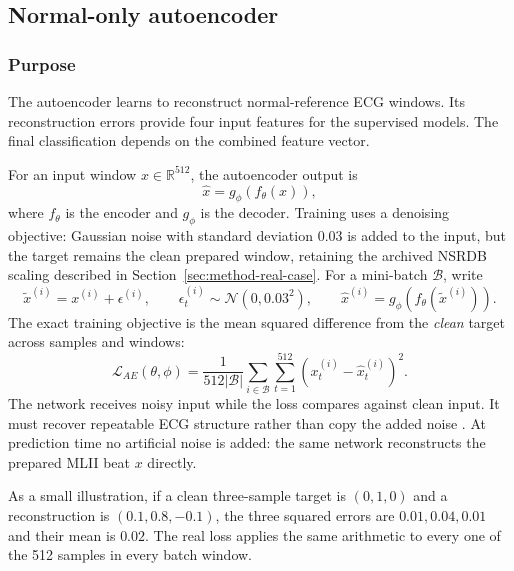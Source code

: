 \subsection{Normal-only autoencoder}

\subsubsection{Purpose}

The autoencoder learns to reconstruct normal-reference ECG windows. Its
reconstruction errors provide four input features for the supervised models.
The final classification depends on the combined feature vector.

For an input window $x\in\mathbb{R}^{512}$, the autoencoder output is
\begin{equation}
 \widehat x=g_{\phi}(f_{\theta}(x)),
\end{equation}
where $f_{\theta}$ is the encoder and $g_{\phi}$ is the decoder. Training uses
a denoising objective: Gaussian noise with standard deviation 0.03 is added to
the input, but the target remains the clean prepared window, retaining the
archived NSRDB scaling described in Section~\ref{sec:method-real-case}. For a
mini-batch $\mathcal{B}$, write
\begin{equation}
 \widetilde x^{(i)}=x^{(i)}+\epsilon^{(i)},\qquad
 \epsilon_t^{(i)}\sim\mathcal{N}(0,0.03^2),\qquad
 \widehat x^{(i)}=g_{\phi}(f_{\theta}(\widetilde x^{(i)})).
\end{equation}
The exact training objective is the mean squared difference from the
\emph{clean} target across samples and windows:
\begin{equation}
 \mathcal{L}_{AE}(\theta,\phi)=
 \frac{1}{512|\mathcal{B}|}
 \sum_{i\in\mathcal{B}}\sum_{t=1}^{512}
 (x^{(i)}_t-\widehat x^{(i)}_t)^2.
 \label{eq:ae-loss-final}
\end{equation}
The network receives noisy input while the loss compares against clean input.
It must recover repeatable ECG structure rather than copy the added noise
\cite{vincent2008denoising}. At prediction time no artificial noise is added:
the same network reconstructs the prepared MLII beat $x$ directly.

As a small illustration, if a clean three-sample target is $(0,1,0)$ and a
reconstruction is $(0.1,0.8,-0.1)$, the three squared errors are
$0.01,0.04,0.01$ and their mean is $0.02$. The real loss applies the same
arithmetic to every one of the 512 samples in every batch window.

